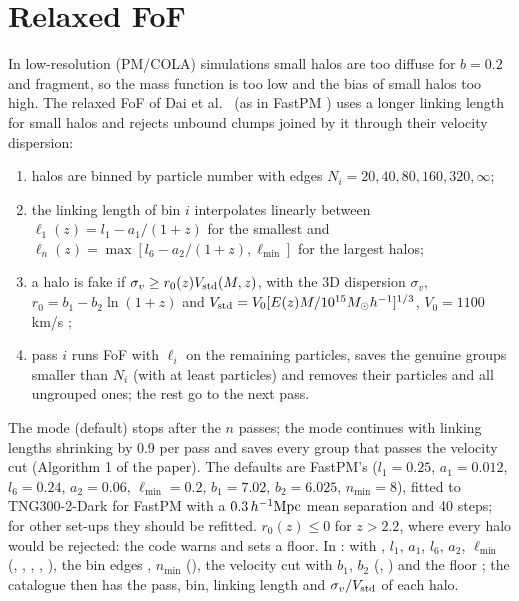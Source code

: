 \section{Relaxed FoF}\label{sec:halo-rfof}

In low-resolution (PM/COLA) simulations small halos are too diffuse for $b=0.2$ and fragment, so the mass function is too low and the
bias of small halos too high. The relaxed FoF of Dai et al.\ \cite{Dai2019} (as in FastPM \cite{Feng2016}) uses a longer linking length
for small halos and rejects unbound clumps joined by it through their velocity dispersion:
\begin{enumerate}
\item halos are binned by particle number with edges $N_i=20,40,80,160,320,\infty$;
\item the linking length of bin $i$ interpolates linearly between $\ell_1(z)=l_1-a_1/(1+z)$ for the smallest and
      $\ell_n(z)=\max[l_6-a_2/(1+z),\ell_{\min}]$ for the largest halos;
\item a halo is fake if $\sigma_v\ge r_0(z)V_{\rm std}(M,z)$, with the 3D dispersion $\sigma_v$, $r_0=b_1-b_2\ln(1+z)$ and
      $V_{\rm std}=V_0[E(z)M/10^{15}M_\odot h^{-1}]^{1/3}$, $V_0=1100$\,km/s \cite{Evrard2008};
\item pass $i$ runs FoF with $\ell_i$ on the remaining particles, saves the genuine groups smaller than $N_i$ (with at least
       particles) and removes their particles and all ungrouped ones; the rest go to the next pass.
\end{enumerate}
The  mode (default) stops after the $n$ passes; the  mode continues with linking lengths shrinking by 0.9 per
pass and saves every group that passes the velocity cut (Algorithm 1 of the paper). The defaults are FastPM's
($l_1=0.25$, $a_1=0.012$, $l_6=0.24$, $a_2=0.06$, $\ell_{\min}=0.2$, $b_1=7.02$, $b_2=6.025$, $n_{\min}=8$), fitted to TNG300-2-Dark for
FastPM with a $0.3\,h^{-1}\mathrm{Mpc}$ mean separation and 40 steps; for other set-ups they should be refitted. $r_0(z)\le0$ for $z>2.2$, where every halo
would be rejected: the code warns and  sets a floor. In :  with , $l_1$, $a_1$, $l_6$, $a_2$, $\ell_{\min}$
(, , , ,
), the bin edges , $n_{\min}$ (),
the velocity cut  with $b_1$, $b_2$ (, )
and the floor ; the catalogue then has the pass, bin, linking length and $\sigma_v/V_{\rm std}$ of each halo.

